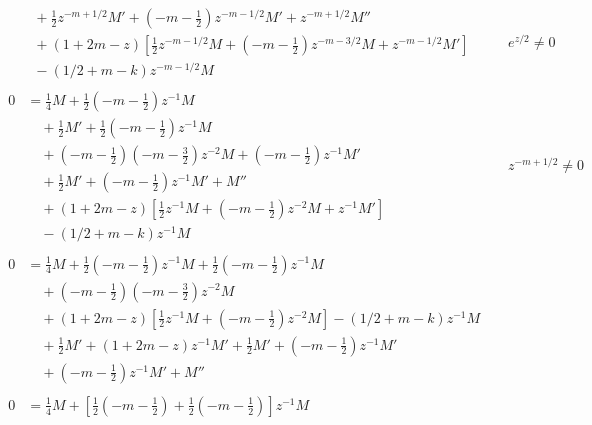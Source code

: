 \documentclass[a4paper,12pt, leqno, answers]{exam}
\begin{document}
\begin{questions}
\begin{solution}
\begin{align*}
\begin{split}
                &\quad {}+ \frac{1}{2} z^{-m + 1/2} M' + \left( -m - \frac{1}{2} \right) z^{-m - 1/2} M' + z^{-m + 1/2} M'' \\
                &\quad {}+ (1 + 2 m - z) \left[ \frac{1}{2} z^{-m - 1/2} M + \left( -m - \frac{1}{2} \right) z^{-m - 3/2} M + z^{-m - 1/2} M' \right] \\
                &\quad {}- (1/2 + m - k) z^{-m - 1/2} M
            \end{split} && e^{z/2} \neq 0 \\
            \begin{split}
                0 &= \frac{1}{4} M + \frac{1}{2} \left( -m - \frac{1}{2} \right) z^{-1} M \\
                &\quad {}+ \frac{1}{2} M' + \frac{1}{2} \left( -m - \frac{1}{2} \right) z^{-1} M \\
                &\quad {}+ \left( -m - \frac{1}{2} \right) \left( -m - \frac{3}{2} \right) z^{-2} M + \left( -m - \frac{1}{2} \right) z^{-1} M' \\
                &\quad {}+ \frac{1}{2} M' + \left( -m - \frac{1}{2} \right) z^{-1} M' + M'' \\
                &\quad {}+ (1 + 2 m - z) \left[ \frac{1}{2} z^{-1} M + \left( -m - \frac{1}{2} \right) z^{-2} M + z^{-1} M' \right] \\
                &\quad {}- (1/2 + m - k) z^{-1} M
            \end{split} && z^{-m + 1/2} \neq 0 \\
            \begin{split}
                0 &= \frac{1}{4} M + \frac{1}{2} \left( -m - \frac{1}{2} \right) z^{-1} M + \frac{1}{2} \left( -m - \frac{1}{2} \right) z^{-1} M \\
                &\quad {}+ \left( -m - \frac{1}{2} \right) \left( -m - \frac{3}{2} \right) z^{-2} M  \\
                &\quad {}+ (1 + 2 m - z) \left[ \frac{1}{2} z^{-1} M + \left( -m - \frac{1}{2} \right) z^{-2} M \right] - (1/2 + m - k) z^{-1} M \\
                &\quad {}+ \frac{1}{2} M' + (1 + 2 m - z) z^{-1} M' + \frac{1}{2} M' + \left( -m - \frac{1}{2} \right) z^{-1} M' \\
                &\quad {}+ \left( -m - \frac{1}{2} \right) z^{-1} M' + M''
            \end{split} \\
            \begin{split}
                0 &= \frac{1}{4} M + \left[ \frac{1}{2} \left( -m - \frac{1}{2}  \right) + \frac{1}{2} \left( -m - \frac{1}{2} \right) \right] z^{-1} M \\

\end{split}
\end{align*}
\end{solution}
\end{questions}
\end{document}
